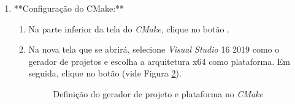 \documentclass[a4paper,11pt]{article}
\newcommand{\cmake}{\textit{CMake}}
\newcommand{\build}{\textit{build}}
\newcommand{\visualstudio}{\textit{Visual Studio}}
\begin{document}
\begin{enumerate}
\begin{enumerate}
		\begin{figure}[H]\centering
			\caption{Configuração do diretório de código-fonte e \build{} no \cmake{}}\label{fig:gmshbuilddest}
		\end{figure}
	\end{enumerate}
	
	\item **Configuração do CMake:**
	\begin{enumerate}
		\item Na parte inferior da tela do \cmake{}, clique no botão .
		\item Na nova tela que se abrirá, selecione \visualstudio{} 16 2019 como o gerador de projetos e escolha a arquitetura x64 como plataforma. Em seguida, clique no botão  (vide Figura \ref{fig:gmshbuildconfigure}).
		
		\begin{figure}[H]\centering
			\caption{Definição do gerador de projeto e plataforma no \cmake{}}\label{fig:gmshbuildconfigure}
		\end{figure}
		

\end{enumerate}
\end{enumerate}
\end{document}
